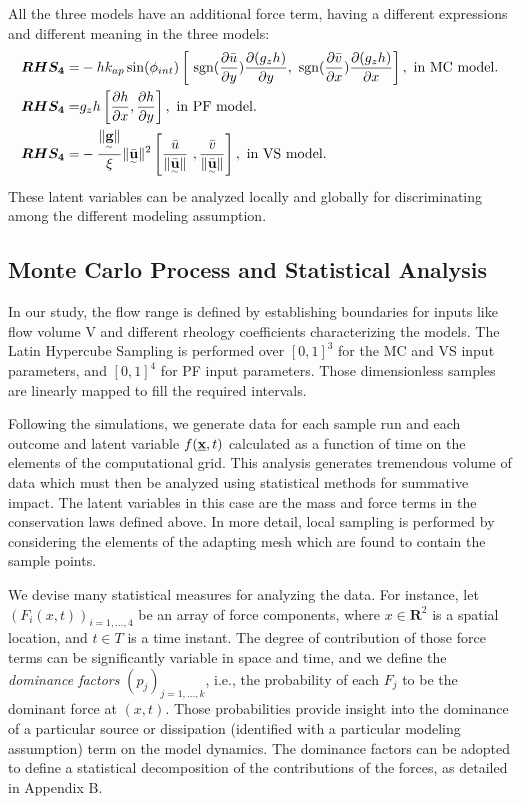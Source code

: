 \documentclass{article}
\begin{document}
All the three models have an additional force term, having a different expressions and different meaning in the three models:
\begin{align}
\boldsymbol{RHS_4} =&  - h k_{ap}\sin(\phi_{int})\left[ \ {\rm sgn}(\frac{\partial \bar{u}}{\partial y}) \frac{\partial (g_z h)}{\partial y},\ {\rm sgn}({\frac{\partial \bar{v}}{\partial x}}) \frac{\partial (g_z h)}{\partial x}\right],\textmd{ in MC model.}\nonumber\\
\boldsymbol{RHS_4} =& g_{z}h\left[\frac{\partial h}{\partial x}, \frac{\partial h}{\partial y}\right],\textmd{ in PF model.}\\
\boldsymbol{RHS_4} =& -\frac{\| \underset{^\sim}{\textbf g} \|}{\xi}\| \underset{^\sim}{\bar{\textbf u}} \|^2\left[\frac{\bar{u}}{\| \underset{^\sim}{\bar{\textbf u}}\|} \ ,\frac{\bar{v}}{\| \underset{^\sim}{\bar{\textbf u}}\|}\right],\textmd{ in VS model.}\nonumber
\end{align}
These latent variables can be analyzed locally and globally for discriminating among the different modeling assumption.

\subsection{Monte Carlo Process and Statistical Analysis}
In our study, the flow range is defined by establishing boundaries for inputs like flow volume V and different rheology coefficients characterizing the models. The Latin Hypercube Sampling is performed over $[0,1]^3$ for the MC and VS input parameters, and $[0,1]^4$ for PF input parameters. Those dimensionless samples are linearly  mapped to fill the required intervals.

Following the simulations, we generate data for each sample run and each outcome and latent variable $f(\underline{\textbf x},t)$ calculated as a function of time on the elements of the computational grid. This analysis generates tremendous volume of data which must then be analyzed using statistical methods for summative impact. The latent variables in this case are the mass and force terms in the conservation laws defined above. In more detail, local sampling is performed by considering the elements of the adapting mesh which are found to contain the sample points. 

We devise many statistical measures for analyzing the data. For instance, let $(F_i(x,t))_{i=1,\dots, 4}$ be an array of force components, where $x\in \mathbf R^2$ is a spatial location, and $t\in T$ is a time instant. The degree of contribution of those force terms can be significantly variable in space and time, and we define the \emph{dominance factors} $(p_j)_{j=1,\dots, k}$, i.e., the probability of each $F_j$ to be the dominant force at $(x,t)$. Those probabilities provide insight into the dominance of a particular source or dissipation (identified with a particular modeling assumption) term on the model dynamics. The dominance factors can be adopted to define a statistical decomposition of the contributions of the forces, as detailed in Appendix B.
\end{document}
